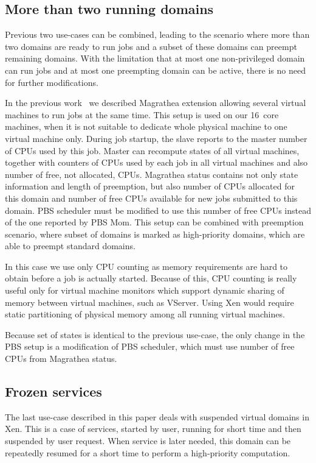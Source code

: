 \documentclass{sig-alternate}
\begin{document}
\subsection{More than two running domains}

Previous two use-cases can be combined, leading to the scenario where more
than two domains are ready to run jobs and a subset of these
domains can preempt remaining domains. With the limitation that at most one non-privileged domain can run jobs and
at most one preempting domain can be active, there is no need for further modifications.

In the previous work~\cite{vee} we described Magrathea extension allowing several virtual machines to run jobs at the same 
time. This setup is used on our 16~core machines, when it is not suitable
to dedicate whole physical machine to one virtual machine only.
During job startup, the slave reports to the master number of CPUs used by this job. 
Master can recompute states of all virtual machines, together with counters of CPUs used by each job in all virtual
machines and also number of free, not allocated, CPUs. Magrathea status contains not only state information and length
of preemption, but also number of CPUs allocated for this domain and number of free CPUs available for new jobs
submitted to this domain. PBS scheduler must be modified to use this
number of free CPUs instead of the one reported by 
PBS Mom. This setup can be combined with preemption scenario, where subset of domains is marked as high-priority 
domains, which are able to preempt standard domains.

In this case we use only CPU counting as memory requirements are hard to
obtain before a job is actually started. Because of this, CPU counting is
really useful only for virtual machine monitors which support dynamic sharing
of memory between virtual machines, such as VServer. Using Xen would require
static partitioning of physical memory among all running virtual machines.

Because set of states is identical to the previous use-case, the only
change in the PBS setup is a modification 
of PBS scheduler, which must use number of free CPUs from Magrathea status.

\subsection{Frozen services}

The last use-case described in this paper deals with suspended virtual domains in Xen. This is a case of services, started
by user, running for short time and then suspended by user request. When service is later needed, this domain can 
be repeatedly resumed for a short time to perform a high-priority computation.
\end{document}
